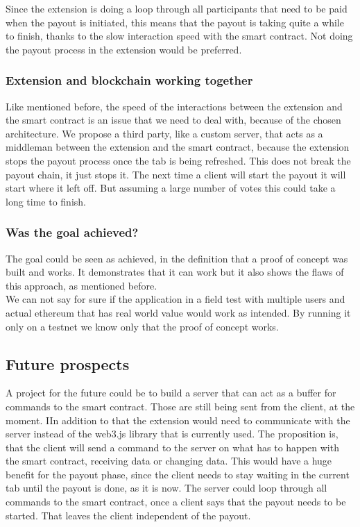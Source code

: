 \documentclass[sigconf]{acmart}
\begin{document}
Since the extension is doing a loop through all participants that need to be paid when the payout is initiated, this means that the payout is taking quite a while to finish, thanks to the slow interaction speed with the smart contract.
Not doing the payout process in the extension would be preferred.


\subsubsection{Extension and blockchain working together}

Like mentioned before, the speed of the interactions between the extension and the smart contract is an issue that we need to deal with, because of the chosen architecture.
We propose a third party, like a custom server, that acts as a middleman between the extension and the smart contract, because the extension stops the payout process once the tab is being refreshed. This does not break the payout chain, it just stops it. The next time a client will start the payout it will start where it left off. But assuming a large number of votes this could take a long time to finish.


\subsubsection{Was the goal achieved?}

The goal could be seen as achieved, in the definition that a proof of concept was built and works. It demonstrates that it can work but it also shows the flaws of this approach, as mentioned before.\\

We can not say for sure if the application in a field test with multiple users and actual ethereum that has real world value would work as intended. By running it only on a testnet we know only that the proof of concept works.


\subsection{Future prospects}

A project for the future could be to build a server that can act as a buffer for commands to the smart contract. Those are still being sent from the client, at the moment. IIn addition to that the extension would need to communicate with the server instead of the web3.js library that is currently used. \cite{web3} The proposition is, that the client will send a command to the server on what has to happen with the smart contract, receiving data or changing data. This would have a huge benefit for the payout phase, since the client needs to stay waiting in the current tab until the payout is done, as it is now. The server could loop through all commands to the smart contract, once a client says that the payout needs to be started. That leaves the client independent of the payout.\\
\end{document}
